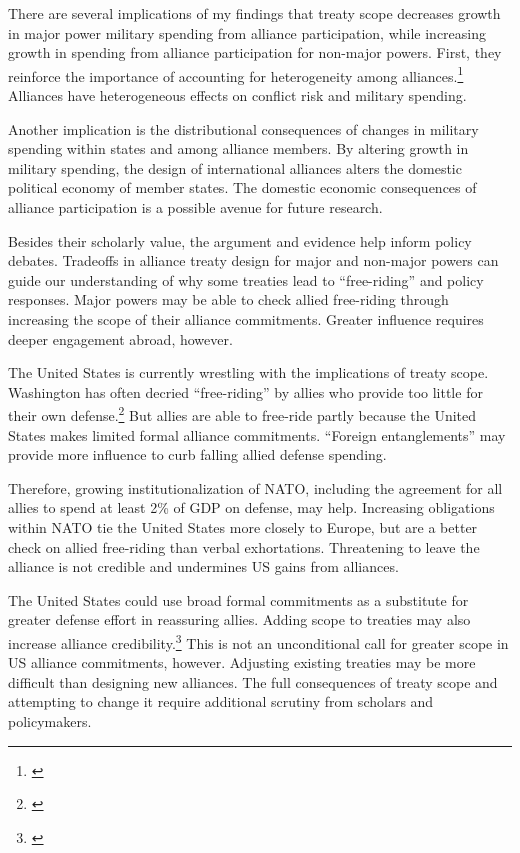 \documentclass[12pt]{article}
\begin{document}
There are several implications of my findings that treaty scope decreases growth in major power military spending from alliance participation, while increasing growth in spending from alliance participation for non-major powers.  
First, they reinforce the importance of accounting for heterogeneity among alliances.\footnote{\citep{Leeds2003, Benson2012, DigiuseppePoast2016}} 
Alliances have heterogeneous effects on conflict risk and military spending. 


Another implication is the distributional consequences of changes in military spending within states and among alliance members.  
By altering growth in military spending, the design of international alliances alters the domestic political economy of member states. 
The domestic economic consequences of alliance participation is a possible avenue for future research. 


Besides their scholarly value, the argument and evidence help inform policy debates. 
Tradeoffs in alliance treaty design for major and non-major powers can guide our understanding of why some treaties lead to ``free-riding'' and policy responses. 
Major powers may be able to check allied free-riding through increasing the scope of their alliance commitments. 
Greater influence requires deeper engagement abroad, however. 


The United States is currently wrestling with the implications of treaty scope. 
Washington has often decried ``free-riding'' by allies who provide too little for their own defense.\footnote{\citep{Lanoszka2015}} 
But allies are able to free-ride partly because the United States makes limited formal alliance commitments. 
``Foreign entanglements'' may provide more influence to curb falling allied defense spending. 

 
Therefore, growing institutionalization of NATO, including the agreement for all allies to spend at least 2\% of GDP on defense, may help.
Increasing obligations within NATO tie the United States more closely to Europe, but are a better check on allied free-riding than verbal exhortations. 
Threatening to leave the alliance is not credible and undermines US gains from alliances. 


The United States could use broad formal commitments as a substitute for greater defense effort in reassuring allies.
Adding scope to treaties may also increase alliance credibility.\footnote{\citep{Poast2013}}
This is not an unconditional call for greater scope in US alliance commitments, however. 
Adjusting existing treaties may be more difficult than designing new alliances. 
The full consequences of treaty scope and attempting to change it require additional scrutiny from scholars and policymakers. 

 



\singlespace
 
 
\end{document}
